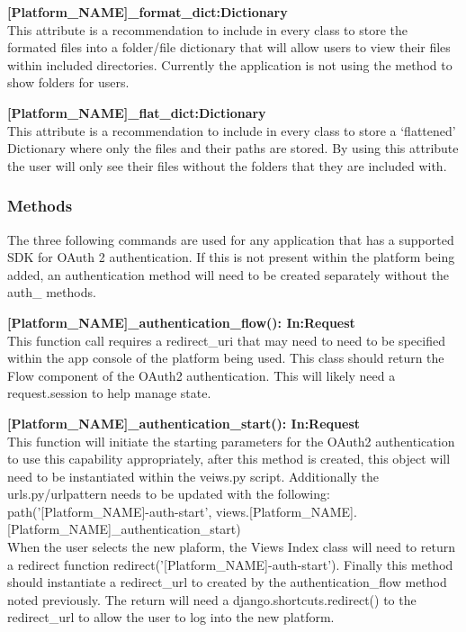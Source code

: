 \textbf{[Platform\_NAME]\_format\_dict:Dictionary} \\
This attribute is a recommendation to include in every class to store the formated files into a folder/file dictionary that will allow 
users to view their files within included directories. Currently the application is not using the method to show folders for users.

\textbf{[Platform\_NAME]\_flat\_dict:Dictionary} \\
This attribute is a recommendation to include in every class to store a `flattened' Dictionary where only the files and their paths are 
stored. By using this attribute the user will only see their files without the folders that they are included with. 

\subsubsection{Methods}
The three following commands are used for any application that has a supported SDK for OAuth 2 authentication. If this is not present
within the platform being added, an authentication method will need to be created separately without the auth\_ methods.

\textbf{[Platform\_NAME]\_authentication\_flow(): In:Request} \\
This function call requires a redirect\_uri that may need to need to be specified within the app console 
of the platform being used. This class should return the Flow component of the OAuth2 authentication. This 
will likely need a request.session to help manage state.

\textbf{[Platform\_NAME]\_authentication\_start(): In:Request} \\
This function will initiate the starting parameters for the OAuth2 authentication to use this 
capability appropriately, after this method is created, this object will need to be instantiated
within the veiws.py script. Additionally the urls.py/urlpattern needs to be updated with the following: \\
  path('[Platform\_NAME]-auth-start', views.[Platform\_NAME].[Platform\_NAME]\_authentication\_start) \\
When the user selects the new plaform, the Views Index class will need to return a redirect function
redirect('[Platform\_NAME]-auth-start'). Finally this method should instantiate a redirect\_url to created by the 
authentication\_flow method noted previously. The return will need a django.shortcuts.redirect() to the redirect\_url 
to allow the user to log into the new platform.

